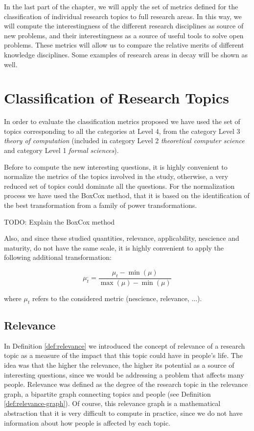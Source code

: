 In the last part of the chapter, we will apply the set of metrics defined for the classification of individual research topics to full research areas. In this way, we will compute the interestingness of the different research disciplines as source of new problems, and their interestingness as a source of useful tools to solve open problems. These metrics will allow us to compare the relative merits of different knowledge disciplines. Some examples of research areas in decay will be shown as well.

\section{Classification of Research Topics}

In order to evaluate the classification metrics proposed we have used the set of topics corresponding to all the categories at Level 4, from the category Level 3 \emph{theory of computation} (included in category Level 2 \emph{theoretical computer science} and category Level 1 \emph{formal sciences}).

Before to compute the new interesting questions, it is highly convenient to normalize the metrics of the topics involved in the study, otherwise, a very reduced set of topics could dominate all the questions. For the normalization process we have used the BoxCox method, that it is based on the identification of the best transformation from a family of power transformations.

{\color{red} TODO: Explain the BoxCox method} 

Also, and since these studied quantities, relevance, applicability, nescience and maturity, do not have the same scale, it is highly convenient to apply the following additional transformation:

\[
\mu_{t}^{,}=\frac{\mu_{t}-\min(\mu)}{\max(\mu)-\min(\mu)}
\]

where $\mu_t$ refers to the considered metric (nescience, relevance, ...). 

\subsection{Relevance}

In Definition \ref{def:relevance} we introduced the concept of relevance of a research topic as a measure of the impact that this topic could have in people's life. The idea was that the higher the relevance, the higher its potential as a source of interesting questions, since we would be addressing a problem that affects many people. Relevance was defined as the degree of the research topic in the relevance graph, a bipartite graph connecting topics and people (see Definition \ref{def:relevance-graph}). Of course, this relevance graph is a mathematical abstraction that it is very difficult to compute in practice, since we do not have information about how people is affected by each topic.

